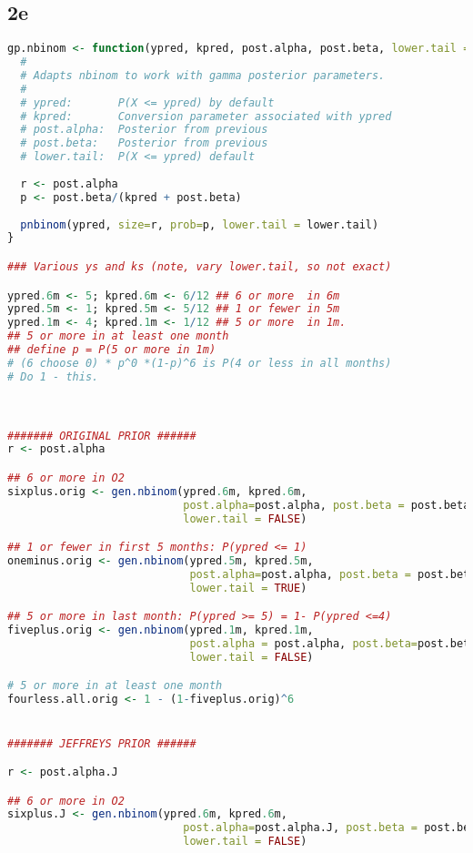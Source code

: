 \documentclass{article}
\begin{document}
\subsection{2e} \label{appA2e}
\begin{lstlisting}[language=R]
gp.nbinom <- function(ypred, kpred, post.alpha, post.beta, lower.tail = TRUE) {
  #
  # Adapts nbinom to work with gamma posterior parameters.
  #
  # ypred:       P(X <= ypred) by default
  # kpred:       Conversion parameter associated with ypred
  # post.alpha:  Posterior from previous
  # post.beta:   Posterior from previous
  # lower.tail:  P(X <= ypred) default
  
  r <- post.alpha
  p <- post.beta/(kpred + post.beta)
  
  pnbinom(ypred, size=r, prob=p, lower.tail = lower.tail)
}

### Various ys and ks (note, vary lower.tail, so not exact)

ypred.6m <- 5; kpred.6m <- 6/12 ## 6 or more  in 6m
ypred.5m <- 1; kpred.5m <- 5/12 ## 1 or fewer in 5m
ypred.1m <- 4; kpred.1m <- 1/12 ## 5 or more  in 1m. 
## 5 or more in at least one month
## define p = P(5 or more in 1m)
# (6 choose 0) * p^0 *(1-p)^6 is P(4 or less in all months)
# Do 1 - this. 



####### ORIGINAL PRIOR ######
r <- post.alpha

## 6 or more in O2
sixplus.orig <- gen.nbinom(ypred.6m, kpred.6m, 
                           post.alpha=post.alpha, post.beta = post.beta, 
                           lower.tail = FALSE)

## 1 or fewer in first 5 months: P(ypred <= 1)
oneminus.orig <- gen.nbinom(ypred.5m, kpred.5m, 
                            post.alpha=post.alpha, post.beta = post.beta, 
                            lower.tail = TRUE)

## 5 or more in last month: P(ypred >= 5) = 1- P(ypred <=4)
fiveplus.orig <- gen.nbinom(ypred.1m, kpred.1m, 
                            post.alpha = post.alpha, post.beta=post.beta, 
                            lower.tail = FALSE)

# 5 or more in at least one month
fourless.all.orig <- 1 - (1-fiveplus.orig)^6


####### JEFFREYS PRIOR ######

r <- post.alpha.J

## 6 or more in O2
sixplus.J <- gen.nbinom(ypred.6m, kpred.6m, 
                           post.alpha=post.alpha.J, post.beta = post.beta.J, 
                           lower.tail = FALSE)


\end{lstlisting}
\end{document}
